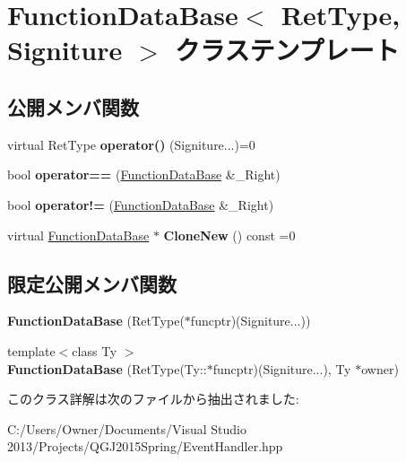 \hypertarget{class_function_data_base}{}\section{Function\+Data\+Base$<$ Ret\+Type, Signiture $>$ クラステンプレート}
\label{class_function_data_base}
\subsection*{公開メンバ関数}
\begin{DoxyCompactItemize}
\item 
virtual Ret\+Type {\bfseries operator()} (Signiture...)=0\hypertarget{class_function_data_base_ad0bc107eb2723e49e5d82fb7c8e5ca23}{}\label{class_function_data_base_ad0bc107eb2723e49e5d82fb7c8e5ca23}

\item 
bool {\bfseries operator==} (\hyperlink{class_function_data_base}{Function\+Data\+Base} \&\+\_\+\+Right)\hypertarget{class_function_data_base_afe4793c666bf055759845200f3d64f9e}{}\label{class_function_data_base_afe4793c666bf055759845200f3d64f9e}

\item 
bool {\bfseries operator!=} (\hyperlink{class_function_data_base}{Function\+Data\+Base} \&\+\_\+\+Right)\hypertarget{class_function_data_base_a1910091d31082208cbc277bfd76e517e}{}\label{class_function_data_base_a1910091d31082208cbc277bfd76e517e}

\item 
virtual \hyperlink{class_function_data_base}{Function\+Data\+Base} $\ast$ {\bfseries Clone\+New} () const  =0\hypertarget{class_function_data_base_af2acbd04367ede134598b68687d7c542}{}\label{class_function_data_base_af2acbd04367ede134598b68687d7c542}

\end{DoxyCompactItemize}
\subsection*{限定公開メンバ関数}
\begin{DoxyCompactItemize}
\item 
{\bfseries Function\+Data\+Base} (Ret\+Type($\ast$funcptr)(Signiture...))\hypertarget{class_function_data_base_ace293d3f494903d50af1b4d84b984b67}{}\label{class_function_data_base_ace293d3f494903d50af1b4d84b984b67}

\item 
{\footnotesize template$<$class Ty $>$ }\\{\bfseries Function\+Data\+Base} (Ret\+Type(Ty\+::$\ast$funcptr)(Signiture...), Ty $\ast$owner)\hypertarget{class_function_data_base_aa60dfc75fe24c537a018a7834c0d4afc}{}\label{class_function_data_base_aa60dfc75fe24c537a018a7834c0d4afc}

\end{DoxyCompactItemize}


このクラス詳解は次のファイルから抽出されました\+:\begin{DoxyCompactItemize}
\item 
C\+:/\+Users/\+Owner/\+Documents/\+Visual Studio 2013/\+Projects/\+Q\+G\+J2015\+Spring/Event\+Handler.\+hpp\end{DoxyCompactItemize}
